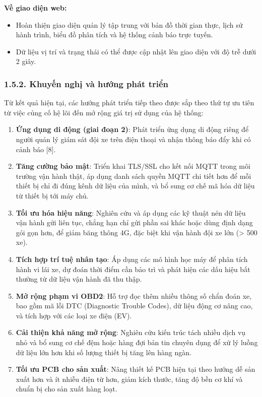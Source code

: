 \documentclass[a4paper]{extarticle}
\providecommand{\tightlist}{%
  \setlength{\itemsep}{0pt}\setlength{\parskip}{0pt}}
\begin{document}
\textbf{Về giao diện web:}

\begin{itemize}
\tightlist
\item
  Hoàn thiện giao diện quản lý tập trung với bản đồ thời gian thực, lịch
  sử hành trình, biểu đồ phân tích và hệ thống cảnh báo trực tuyến.
\item
  Dữ liệu vị trí và trạng thái có thể được cập nhật lên giao diện với độ
  trễ dưới 2 giây.
\end{itemize}

\subsubsection{1.5.2. Khuyến nghị và hướng phát triển}\label{khuyux1ebfn-nghux1ecb-vuxe0-hux1b0ux1edbng-phuxe1t-triux1ec3n}

Từ kết quả hiện tại, các hướng phát triển tiếp theo được sắp theo thứ tự
ưu tiên từ việc củng cố hệ lõi đến mở rộng giá trị sử dụng của hệ thống:

\begin{enumerate}
\def\labelenumi{\arabic{enumi}.}
\tightlist
\item
  \textbf{Ứng dụng di động (giai đoạn 2)}: Phát triển ứng dụng di động riêng
  để người quản lý giám sát đội xe trên điện thoại và nhận thông báo đẩy
  khi có cảnh báo {[}8{]}.
\item
  \textbf{Tăng cường bảo mật}: Triển khai TLS/SSL cho kết nối MQTT trong
  môi trường vận hành thật, áp dụng danh sách quyền MQTT chi tiết hơn
  để mỗi thiết bị chỉ đi đúng kênh dữ liệu của mình, và bổ sung cơ chế
  mã hóa dữ liệu từ thiết bị tới máy chủ.
\item
  \textbf{Tối ưu hóa hiệu năng}: Nghiên cứu và áp dụng các kỹ thuật nén dữ
  liệu vận hành gửi liên tục, chẳng hạn chỉ gửi phần sai khác hoặc
  dùng định dạng gói gọn hơn, để giảm băng thông 4G, đặc biệt khi vận
  hành đội xe lớn (\textgreater{} 500 xe).
\item
  \textbf{Tích hợp trí tuệ nhân tạo}: Áp dụng các mô hình học máy để phân
  tích hành vi lái xe, dự đoán thời điểm cần bảo trì và phát hiện các
  dấu hiệu bất thường từ dữ liệu vận hành đã thu thập.
\item
  \textbf{Mở rộng phạm vi OBD2}: Hỗ trợ đọc thêm nhiều thông số chẩn đoán
  xe, bao gồm mã lỗi DTC (Diagnostic Trouble Codes), dữ liệu động cơ
  nâng cao, và tích hợp với các loại xe điện (EV).
\item
  \textbf{Cải thiện khả năng mở rộng}: Nghiên cứu kiến trúc tách nhiều dịch
  vụ nhỏ và bổ sung cơ chế đệm hoặc hàng đợi bản tin chuyên dụng để xử
  lý luồng dữ liệu lớn hơn khi số lượng thiết bị tăng lên hàng ngàn.
\item
  \textbf{Tối ưu PCB cho sản xuất}: Nâng thiết kế PCB hiện tại theo hướng
  dễ sản xuất hơn và ít nhiễu điện từ hơn, giảm kích thước, tăng độ
  bền cơ khí và chuẩn bị cho sản xuất hàng loạt.
\end{enumerate}
\end{document}
